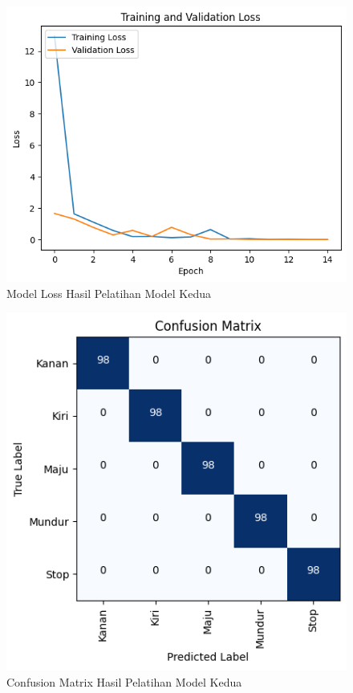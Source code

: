 \begin{figure}[H]
  \centering
  \includegraphics[scale=0.7]{gambar/losstdk.png}
  \caption{Model Loss Hasil Pelatihan Model Kedua}
  \label{fig:LossHasilPelatihanModelKedua}
\end{figure}

\begin{figure} [H] \centering
  \includegraphics[scale=0.8]{gambar/connfusiontdk.png}
  \caption{Confusion Matrix Hasil Pelatihan Model Kedua}
  \label{fig:ConfusionMatrixHasilPelatihanModelKedua}
\end{figure}

